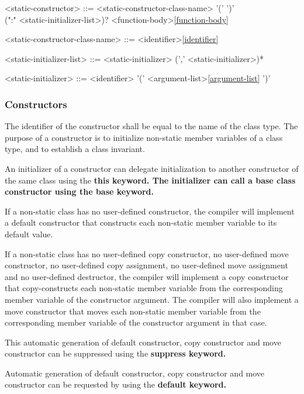 \documentclass[a4paper,oneside,11pt]{article}
\begin{document}
\begin{grammar}
\label{static-constructor}<static-constructor> ::=  <static-constructor-class-name> '(' ')'\\
(":" <static-initializer-list>)? <function-body>\ref{function-body}

<static-constructor-class-name> ::= <identifier>\ref{identifier}

<static-initializer-list> ::= <static-initializer> (',' <static-initializer>)*

<static-initializer> ::= <identifier> '(' <argument-list>\ref{argument-list} ')'
\end{grammar}

\subsubsection{Constructors}

The identifier of the constructor shall be equal to the name of the class type.
The purpose of a constructor is to initialize non-static member variables of a class type,
and to establish a class invariant.

An initializer of a constructor can delegate initialization to another constructor of
the same class using the \bf{this} keyword.
The initializer can call a base class constructor using the \bf{base} keyword.

If a non-static class has no user-defined constructor, the compiler will implement a default constructor that constructs
each non-static member variable to its default value.

If a non-static class has no user-defined copy constructor,
no user-defined move constructor, no user-defined copy assignment, no user-defined move assignment and no user-defined destructor,
the compiler will implement a copy constructor that
copy-constructs each non-static member variable from the corresponding member variable of the constructor argument.
The compiler will also implement a move constructor that moves each non-static member variable from the corresponding
member variable of the constructor argument in that case.

This automatic generation of default constructor, copy constructor and move constructor can be suppressed using the \bf{suppress} keyword.

Automatic generation of default constructor, copy constructor and move constructor can be requested by using the \bf{default} keyword.
\end{document}
